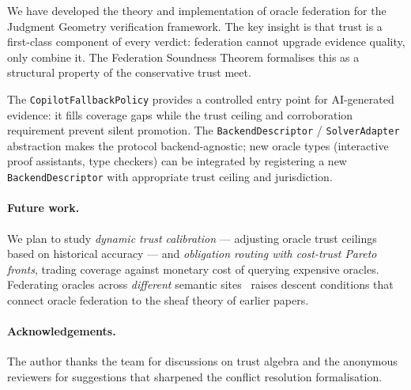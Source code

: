 \documentclass[11pt]{article}
\begin{document}
We have developed the theory and implementation of oracle federation for
the Judgment Geometry verification framework.  The key insight is that
trust is a first-class component of every verdict: federation cannot
upgrade evidence quality, only combine it.  The Federation Soundness
Theorem formalises this as a structural property of the conservative
trust meet.

The \texttt{CopilotFallbackPolicy} provides a controlled entry point for
AI-generated evidence: it fills coverage gaps while the trust ceiling and
corroboration requirement prevent silent promotion.  The
\texttt{BackendDescriptor} / \texttt{SolverAdapter} abstraction makes the
protocol backend-agnostic; new oracle types (\eg interactive proof
assistants, type checkers) can be integrated by registering a new
\texttt{BackendDescriptor} with appropriate trust ceiling and
jurisdiction.

\paragraph{Future work.}
We plan to study \emph{dynamic trust calibration} — adjusting oracle
trust ceilings based on historical accuracy — and \emph{obligation
routing with cost-trust Pareto fronts}, trading coverage against
monetary cost of querying expensive oracles.  Federating oracles across
\emph{different} semantic sites~\cite{jugeo01} raises descent conditions
that connect oracle federation to the sheaf theory of earlier papers.

\paragraph{Acknowledgements.}
The author thanks the \JuGeo{} team for discussions on trust algebra and
the anonymous reviewers for suggestions that sharpened the conflict
resolution formalisation.
\end{document}
